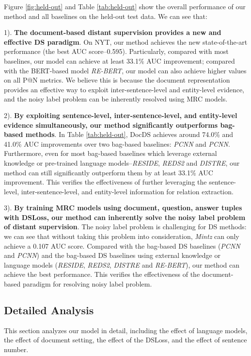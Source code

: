 \documentclass[11pt,a4paper]{article}
\begin{document}
  Figure \ref{fig:held-out} and Table \ref{tab:held-out} show the overall performance of our method and all baselines on the held-out test data.
  We can see that:
  
  1). \textbf{The document-based distant supervision provides a new and effective DS paradigm}. On NYT, our method achieves the new state-of-the-art performance (the best AUC score--0.595). Particularly, compared with most baselines,  our model can achieve at least 33.1\% AUC improvement; compared with the BERT-based model \emph{RE-BERT}, our model can also achieve higher values on all P@N metrics. We believe this is because the document representation provides an effective way to exploit inter-sentence-level and entity-level evidence, and the noisy label problem can be inherently resolved using MRC models.
  
  2). \textbf{By exploiting sentence-level, inter-sentence-level, and entity-level evidence simultaneously, our method significantly outperforms bag-based methods}.
  In Table \ref{tab:held-out}, DocDS achieves around 74.0\% and 41.0\% AUC improvements over two bag-based baselines: \emph{PCNN} and \emph{PCNN}.
  Furthermore, even for most bag-based baselines which leverage external knowledge or pre-trained language models--\emph{RESIDE}, \emph{REDS2} and \emph{DISTRE}, our method can still significantly outperform them by at least 33.1\% AUC improvement.
  This verifies the effectiveness of further leveraging the sentence-level, inter-sentence-level, and entity-level information for relation extraction.
  
  3). \textbf{By training MRC models using document, question, answer tuples with DSLoss, our method can inherently solve the noisy label problem of distant supervision}. 
  The noisy label problem is challenging for DS methods: we can see that without taking this problem into consideration, \emph{Mintz} can only achieve a 0.107 AUC score.
  Compared with the bag-based DS baselines (\emph{PCNN} and \emph{PCNN}) and the bag-based DS baselines using external knowledge or language models (\emph{RESIDE}, \emph{REDS2}, \emph{DISTRE} and \emph{RE-BERT}), our method can achieve the best performance.
  This verifies the effectiveness of the document-based paradigm for resolving noisy label problem.
  
  \subsection{Detailed Analysis}
  This section analyzes our model in detail, including the effect of language models, the effect of document setting, the effect of the DSLoss, and the effect of sentence number.
  
\end{document}
